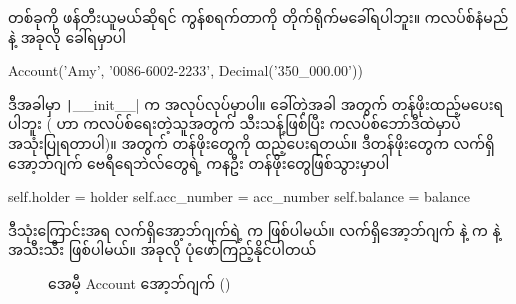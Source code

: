   တစ်ခုကို ဖန်တီးယူမယ်ဆိုရင် ကွန်စရက်တာကို တိုက်ရိုက်မခေါ်ရပါဘူး။ ကလပ်စ်နံမည်နဲ့ အခုလို ခေါ်ရမှာပါ
%
\begin{py}
Account('Amy', '0086-6002-2233', Decimal('350_000.00'))
\end{py}
%
ဒီအခါမှာ \texttt|__init__| က အလုပ်လုပ်မှာပါ။  ခေါ်တဲ့အခါ  အတွက် တန်ဖိုးထည့်မပေးရပါဘူး ( ဟာ ကလပ်စ်ရေးတဲ့သူအတွက် သီးသန့်ဖြစ်ပြီး ကလပ်စ်ဘော်ဒီထဲမှာပဲ အသုံးပြုရတာပါ)။ \fEn{,} \fEn{,}  အတွက် တန်ဖိုးတွေကို ထည့်ပေးရတယ်။ ဒီတန်ဖိုးတွေက  လက်ရှိအော့ဘ်ဂျက်  ဗေရီရေဘဲလ်တွေရဲ့ ကနဦး တန်ဖိုးတွေဖြစ်သွားမှာပါ
%
\begin{py}
self.holder = holder
self.acc_number = acc_number
self.balance = balance
\end{py}
%
ဒီသုံးကြောင်းအရ လက်ရှိအော့ဘ်ဂျက်ရဲ့  က  ဖြစ်ပါမယ်။ လက်ရှိအော့ဘ်ဂျက်  နဲ့  က  နဲ့  အသီးသီး ဖြစ်ပါမယ်။ အခုလို ပုံဖော်ကြည့်နိုင်ပါတယ်

\begin{figure}[tbh!]
\def\fObjFigAttrValWidth{3}
\def\fObjFigAttrValHeight{1}
\newcommand{\figpctw}{0.48}
\caption{အေမီ့ Account အော့ဘ်ဂျက် ()}
\end{figure}

